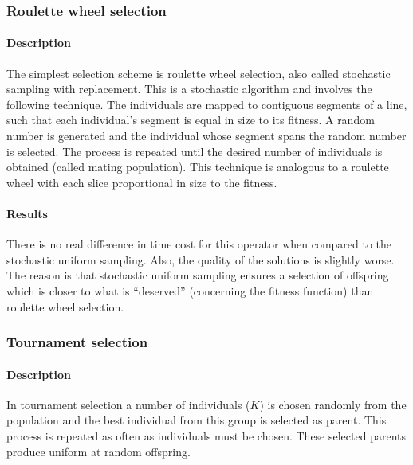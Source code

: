 \documentclass[a4paper,english,11pt,]{scrartcl}
\begin{document}
\subsubsection{Roulette wheel selection}
\paragraph{Description}
The simplest selection scheme is roulette wheel selection, also called stochastic sampling with replacement. This is a stochastic algorithm and involves the following technique. The individuals are mapped to contiguous segments of a line, such that each individual's segment is equal in size to its fitness. A random number is generated and the individual whose segment spans the random number is selected. The process is repeated until the desired number of individuals is obtained (called mating population). This technique is analogous to a roulette wheel with each slice proportional in size to the fitness. 
\paragraph{Results}
There is no real difference in time cost for this operator when compared to the stochastic uniform sampling. Also, the quality of the solutions is slightly worse. The reason is that stochastic uniform sampling ensures a selection of offspring which is closer to what is ``deserved'' (concerning the fitness function) than roulette wheel selection.


% 


\subsubsection{Tournament selection}
\paragraph{Description}
In tournament selection a number of individuals ($K$) is chosen randomly from the population and the best individual from this group is selected as parent. This process is repeated as often as individuals must be chosen. These selected parents produce uniform at random offspring.
\end{document}
